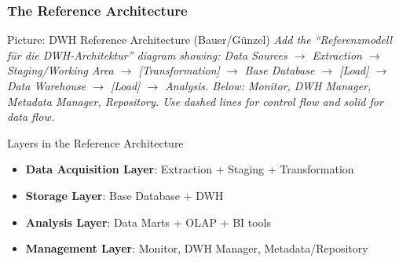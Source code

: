 \begin{frame}
  \frametitle{The Reference Architecture}

  \begin{alertblock}{Picture: DWH Reference Architecture (Bauer/G\"{u}nzel)}
    \textit{Add the ``Referenzmodell für die DWH-Architektur'' diagram showing:
    Data Sources $\to$ Extraction $\to$ Staging/Working Area $\to$
    [Transformation] $\to$ Base Database $\to$ [Load] $\to$ Data Warehouse
    $\to$ [Load] $\to$ Analysis.
    Below: Monitor, DWH Manager, Metadata Manager, Repository.
    Use dashed lines for control flow and solid for data flow.}
  \end{alertblock}

  \begin{block}{Layers in the Reference Architecture}
    \begin{itemize}
      \item \textbf{Data Acquisition Layer}: Extraction + Staging + Transformation
      \item \textbf{Storage Layer}: Base Database + DWH
      \item \textbf{Analysis Layer}: Data Marts + OLAP + BI tools
      \item \textbf{Management Layer}: Monitor, DWH Manager, Metadata/Repository
    \end{itemize}
  \end{block}
\end{frame}
